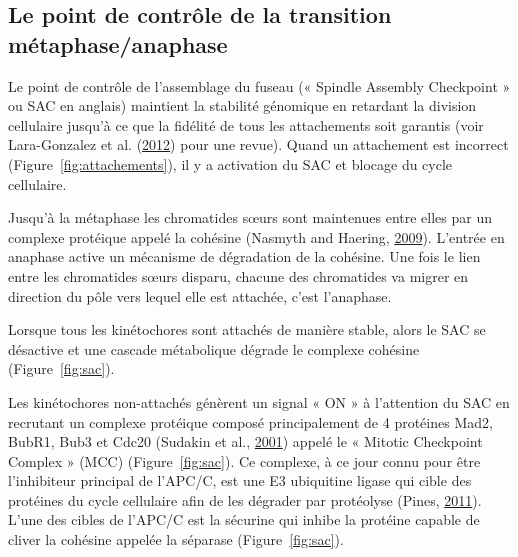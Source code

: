 \documentclass[12pt,a4paper,twoside,openright]{book}
\begin{document}
\subsection{Le point de contrôle de la transition
métaphase/anaphase}\label{le-point-de-contruxf4le-de-la-transition-muxe9taphaseanaphase}

Le point de contrôle de l'assemblage du fuseau (« Spindle Assembly
Checkpoint » ou SAC en anglais) maintient la stabilité génomique en
retardant la division cellulaire jusqu'à ce que la fidélité de tous les
attachements soit garantis (voir Lara-Gonzalez et al.
(\hyperref[ref-Lara-Gonzalez2012]{2012}) pour une revue). Quand un
attachement est incorrect (Figure~\ref{fig:attachements}), il y a
activation du SAC et blocage du cycle cellulaire.

Jusqu'à la métaphase les chromatides sœurs sont maintenues entre elles
par un complexe protéique appelé la cohésine (Nasmyth and Haering,
\hyperref[ref-Nasmyth2009]{2009}). L'entrée en anaphase active un
mécanisme de dégradation de la cohésine. Une fois le lien entre les
chromatides sœurs disparu, chacune des chromatides va migrer en
direction du pôle vers lequel elle est attachée, c'est l'anaphase.

Lorsque tous les kinétochores sont attachés de manière stable, alors le
SAC se désactive et une cascade métabolique dégrade le complexe cohésine
(Figure~\ref{fig:sac}).

Les kinétochores non-attachés génèrent un signal « ON » à l'attention du
SAC en recrutant un complexe protéique composé principalement de 4
protéines Mad2, BubR1, Bub3 et Cdc20 (Sudakin et al.,
\hyperref[ref-Sudakin2001]{2001}) appelé le « Mitotic Checkpoint Complex
» (MCC) (Figure~\ref{fig:sac}). Ce complexe, à ce jour connu pour être
l'inhibiteur principal de l'APC/C, est une E3 ubiquitine ligase qui
cible des protéines du cycle cellulaire afin de les dégrader par
protéolyse (Pines, \hyperref[ref-Pines2011]{2011}). L'une des cibles de
l'APC/C est la sécurine qui inhibe la protéine capable de cliver la
cohésine appelée la séparase (Figure~\ref{fig:sac}).
\end{document}
